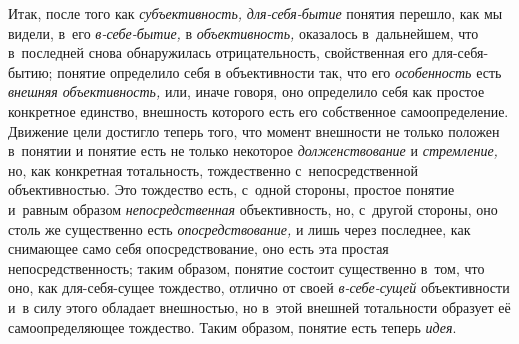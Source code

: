 Итак, после того как
{\em субъективность,}
{\em для-себя-бытие}
понятия перешло, как мы видели, в~его
{\em в-себе-бытие,} в
{\em объективность,}
оказалось в~дальнейшем, что в~последней снова обнаружилась
отрицательность, свойственная его для-себя-бытию; понятие определило себя в
объективности так, что его
{\em особенность} есть
{\em внешняя объективность,}
или, иначе говоря, оно определило себя как простое конкретное
единство, внешность которого есть его собственное самоопределение. Движение
цели достигло теперь того, что момент внешности не только положен в~понятии
и понятие есть не только некоторое
{\em долженствование} и
{\em стремление,} но, как
конкретная тотальность, тождественно с~непосредственной объективностью. Это
тождество есть, с~одной стороны, простое понятие и~равным образом
{\em непосредственная}
объективность, но, с~другой стороны, оно столь же существенно
есть {\em опосредствование,}
и лишь через последнее, как снимающее само себя
опосредствование, оно есть эта простая непосредственность; таким образом,
понятие состоит существенно в~том, что оно, как для-себя-сущее тождество,
отлично от своей
{\em в-себе-сущей}
объективности и~в силу этого обладает внешностью, но в~этой
внешней тотальности образует её самоопределяющее тождество. Таким образом,
понятие есть теперь {\em идея}.

\clearpage

